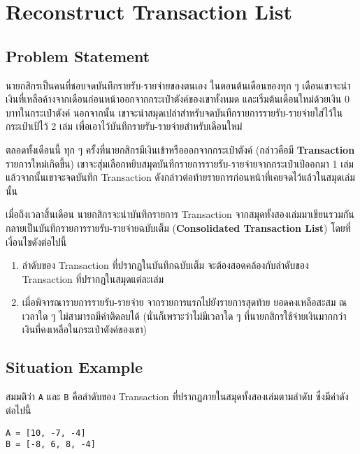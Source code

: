 \section{Reconstruct Transaction List}

\subsection{Problem Statement}

นายกสิกรเป็นคนที่ชอบจดบันทึกรายรับ-รายจ่ายของตนเอง \; 
ในตอนต้นเดือนของทุก ๆ เดือนเขาจะนำเงินที่เหลือค้างจากเดือนก่อนหน้าออกจากกระเป๋าตังค์ของเขาทั้งหมด และเริ่มต้นเดือนใหม่ด้วยเงิน 0 บาทในกระเป๋าตังค์ \;
นอกจากนั้น เขาจะนำสมุดเปล่าสำหรับจดบันทึกรายการรายรับ-รายจ่ายใส่ไว้ในกระเป๋าเป้ไว้ 2 เล่ม เพื่อเอาไว้บันทึกรายรับ-รายจ่ายสำหรับเดือนใหม่

ตลอดทั้งเดือนนี้ ทุก ๆ ครั้งที่นายกสิกรมีเงินเข้าหรือออกจากกระเป๋าตังค์ (กล่าวคือมี \textbf{Transaction} รายการใหม่เกิดขึ้น) \;เขาจะสุ่มเลือกหยิบสมุดบันทึกรายการรายรับ-รายจ่ายจากกระเป๋าเป้ออกมา 1 เล่ม \;
แล้วจากนั้นเขาจะจดบันทึก Transaction ดังกล่าวต่อท้ายรายการก่อนหน้าที่เคยจดไว้แล้วในสมุดเล่มนั้น \;

เมื่อถึงเวลาสิ้นเดือน นายกสิกรจะนำบันทึกรายการ Transaction จากสมุดทั้งสองเล่มมาเขียนรวมกันกลายเป็นบันทึกรายการรายรับ-รายจ่ายฉบับเต็ม (\textbf{Consolidated Transaction List}) โดยที่เงื่อนไขดังต่อไปนี้ \;

\begin{enumerate}
    \item ลำดับของ Transaction ที่ปรากฏในบันทึกฉบับเต็ม จะต้องสอดคล้องกับลำดับของ Transaction ที่ปรากฏในสมุดแต่ละเล่ม
    \item เมื่อพิจารณารายการรายรับ-รายจ่าย จากรายการแรกไปยังรายการสุดท้าย ยอดคงเหลือสะสม ณ เวลาใด ๆ ไม่สามารถมีค่าติดลบได้ (นั่นก็เพราะว่าไม่มีเวลาใด ๆ ที่นายกสิกรใช้จ่ายเงินมากกว่าเงินที่คงเหลือในกระเป๋าตังค์ของเขา)
\end{enumerate}


\subsection{Situation Example}

\noindent
สมมติว่า \lstinline{A} และ \lstinline{B} คือลำดับของ Transaction ที่ปรากฏภายในสมุดทั้งสองเล่มตามลำดับ ซึ่งมีค่าดังต่อไปนี้

\begin{lstlisting}[xleftmargin=2pc,numbers=none]
A = [10, -7, -4]
B = [-8, 6, 8, -4]
\end{lstlisting}

